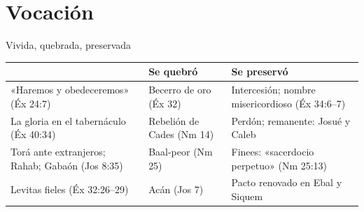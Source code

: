 \section{Vocación}
\begin{frame}{Vivida, quebrada, preservada}
\centering\scriptsize\renewcommand{\arraystretch}{1.3}
\begin{tabular}{>{\RaggedRight\arraybackslash}p{3.7cm}>{\RaggedRight\arraybackslash}p{3.3cm}>{\RaggedRight\arraybackslash}p{4.2cm}}
\toprule
{\color{ladrillo}\bfseries Se vivió} & {\color{ladrillo}\bfseries Se quebró} & {\color{ladrillo}\bfseries Se preservó}\\\midrule
«Haremos y obedeceremos» (Éx 24:7) & Becerro de oro (Éx 32) & Intercesión; nombre misericordioso (Éx 34:6--7)\\
La gloria en el tabernáculo (Éx 40:34) & Rebelión de Cades (Nm 14) & Perdón; remanente: Josué y Caleb\\
Torá ante extranjeros; Rahab; Gabaón (Jos 8:35) & Baal-peor (Nm 25) & Finees: «sacerdocio perpetuo» (Nm 25:13)\\
Levitas fieles (Éx 32:26--29) & Acán (Jos 7) & Pacto renovado en Ebal y Siquem\\
\bottomrule
\end{tabular}
\elabpropia
\vspace{6pt}
\end{frame}

